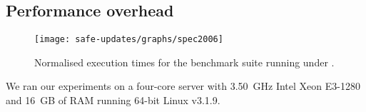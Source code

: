 

\subsection{Performance overhead}
\label{sec:performance}

\begin{figure}[!t]
\centering
\texttt{[image: safe-updates/graphs/spec2006]}
\caption{Normalised execution times for the \speczerosix benchmark suite
running under \mx.}
\label{fig:spec}
\end{figure}

We ran our experiments on a four-core server with 3.50~GHz Intel
Xeon E3-1280 and 16~GB of RAM running 64-bit Linux v3.1.9.

